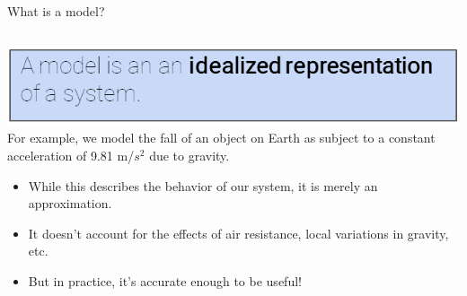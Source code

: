 \documentclass[aspectratio=169]{../latex_main/tntbeamer}  %
\begin{document}
	
	\begin{frame}{What is a model?}
	    \begin{columns}
	        \begin{column}{.5\textwidth}
	                \includegraphics[scale=.4]{Bild3}\\
	                For example, we model the fall of an object on Earth as subject to a constant acceleration of 9.81 m/$s^2$ due to gravity.

	                \begin{itemize}
	                    \item While this describes the behavior of our system, it is merely an approximation.
	                    \item It doesn’t account for the effects of air resistance, local variations in gravity, etc.
	                    \item But in practice, it’s accurate enough to be useful!
	                \end{itemize}
	                
	        \end{column}
	        

\end{columns}
\end{frame}
\end{document}
